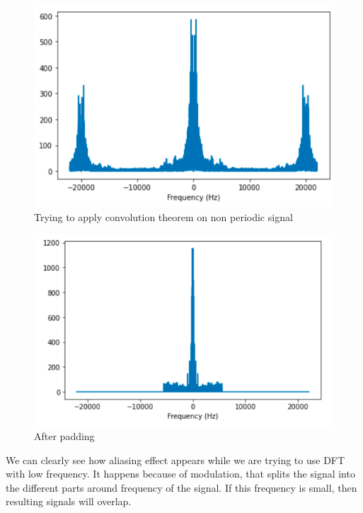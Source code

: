 \documentclass[a4paper]{article}
\begin{document}
        \begin{figure}[H]
            \centering
            \includegraphics[width=\textwidth]{img/p1_3.png}
            \caption{Trying to apply convolution theorem on non periodic signal}
            \label{fig:p1_1}
        \end{figure}
        
        \begin{figure}[H]
            \centering
            \includegraphics[width=\textwidth]{img/p1_4.png}
            \caption{After padding}
            \label{fig:p1_2}
        \end{figure}
        
        We can clearly see how aliasing effect appears while we are trying to use DFT with low frequency. It happens because of modulation, that splits the signal into the different parts around frequency of the signal. If this frequency is small, then resulting signals will overlap.
        
\end{document}

